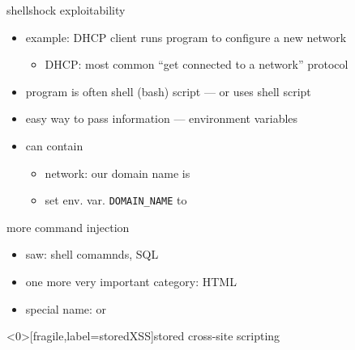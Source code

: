 \begin{frame}[fragile,label=shellShock4]{shellshock exploitability}
    \begin{itemize}
    \item example: DHCP client runs program to configure a new network
        \begin{itemize}
        \item DHCP: most common ``get connected to a network'' protocol
        \end{itemize}
    \item program is often shell (bash) script --- or uses shell script
    \item easy way to pass information --- environment variables
    \item can contain 
        \begin{itemize}
            \item network: our domain name is 
            \item set env. var. \texttt{DOMAIN\_NAME} to 
        \end{itemize}
    \end{itemize}
\end{frame}

\begin{frame}{more command injection}
    \begin{itemize}
    \item saw: shell comamnds, SQL
    \item one more very important category: HTML
    \item special name:  or 
    \end{itemize}
\end{frame}

\begin{frame}<0>[fragile,label=storedXSS]{stored cross-site scripting}
\end{frame}

